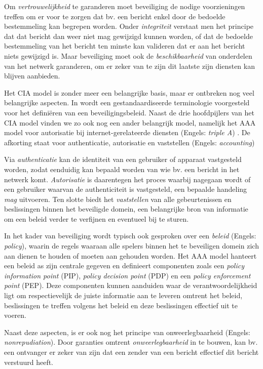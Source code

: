 Om \emph{vertrouwelijkheid} te garanderen moet beveiliging de nodige
voorzieningen treffen om er voor te zorgen dat bv. een bericht enkel door de
bedoelde bestemmeling kan begrepen worden. Onder \emph{integriteit} verstaat
men het principe dat dat bericht dan weer niet mag gewijzigd kunnen worden, of
dat de bedoelde bestemmeling van het bericht ten minste kan valideren dat er
aan het bericht niets gewijzigd is. Maar beveiliging moet ook de
\emph{beschikbaarheid} van onderdelen van het netwerk garanderen, om er zeker
van te zijn dit laatste zijn diensten kan blijven aanbieden.

Het CIA model is zonder meer een belangrijke basis, maar er ontbreken nog veel
belangrijke aspecten. In \citep{rfc:3198} wordt een gestandaardiseerde
terminologie voorgesteld voor het defini\"eren van een beveiligingsbeleid.
Naast de drie hoofdpijlers van het CIA model vinden we zo ook nog een ander
belangrijk model, namelijk het AAA model voor autorisatie bij
internet-gerelateerde diensten (Engels: \emph{triple A}) \citep{rfc:2904}. De
afkorting staat voor authenticatie, autorisatie en vaststellen (Engels:
\emph{accounting})

Via \emph{authenticatie} kan de identiteit van een gebruiker of apparaat
vastgesteld worden, zodat eenduidig kan bepaald worden van wie bv. een bericht
in het netwerk komt. \emph{Autorisatie} is daarentegen het proces waarbij
nagegaan wordt of een gebruiker waarvan de authenticiteit is vastgesteld, een
bepaalde handeling \emph{mag} uitvoeren. Ten slotte biedt het
\emph{vaststellen} van alle gebeurtenissen en beslissingen binnen het
beveiligde domein, een belangrijke bron van informatie om een beleid verder te
verfijnen en eventueel bij te sturen.

In het kader van beveiliging wordt typisch ook gesproken over een \emph{beleid}
(Engels: \emph{policy}), waarin de regels waaraan alle spelers binnen het te
beveiligen domein zich aan dienen te houden of moeten aan gehouden worden. Het
AAA model hanteert een beleid as zijn centrale gegeven en definieert
componenten zoals een \emph{policy information point} (PIP), \emph{policy
decision point} (PDP) en een \emph{policy enforcement point} (PEP). Deze
componenten kunnen aanduiden waar de verantwoordelijkheid ligt om
respectievelijk de juiste informatie aan te leveren omtrent het beleid,
beslissingen te treffen volgens het beleid en deze beslissingen effectief uit
te voeren.

Naast deze aspecten, is er ook nog het principe van onweerlegbaarheid (Engels:
\emph{nonrepudiation}). Door garanties omtrent \emph{onweerlegbaarheid} in te
bouwen, kan bv. een ontvanger er zeker van zijn dat een zender van een bericht
effectief dit bericht verstuurd heeft.

